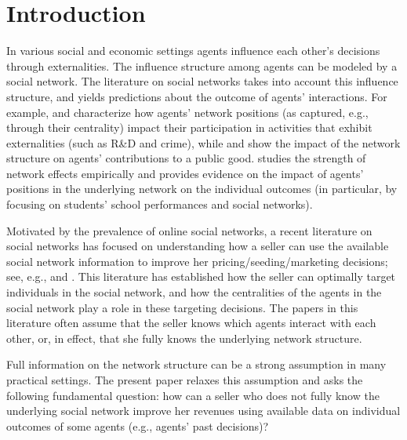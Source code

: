 \documentclass[opre,nonblindrev]{informs3} %
\begin{document}
\maketitle


\section{Introduction} \label{se:Intro}

In various social and economic settings agents influence each other's decisions through externalities. The influence structure among agents can be modeled by a social network. The literature on social networks takes into account this influence structure, and yields predictions about the outcome of agents' interactions.
For example, \citet{ballester2006s} and \citet{bramoulle2014strategic} characterize how
agents' network positions (as captured, e.g., through their centrality)
impact their participation in activities that exhibit externalities (such as R\&D and crime), while
 \citet{bramoulle2007public} and \citet{elliott2013network} show the impact of the network structure on agents' contributions to a public good.
\citet{calvo2009peer}
studies the strength of network effects empirically and
provides evidence on the impact of  agents' positions in the underlying network on  the individual outcomes (in particular, by focusing on students' school performances and social networks).

Motivated by the
prevalence of online social networks, a recent literature on social networks has focused on understanding how a seller can use
the available social network information to improve
her pricing/seeding/marketing
decisions; see, e.g.,
\citet{kempe2003maximizing,candogan2012optimal,belloni2015mechanism,bimpikis2016competitive} and \citet{zhou2016targeted}.
This literature has established how the seller can optimally target individuals in the social network, and how the centralities of the agents in the social network play a role in these targeting decisions.
The papers in this literature often assume that the
seller knows which agents interact with each other,
or, in effect, that she fully knows the underlying network structure.


Full information on the network structure can be a strong assumption  in many practical settings. The present paper relaxes this assumption and asks 
the following fundamental question:
how can a seller who does not fully know the underlying social network improve her  revenues using 
available data on individual outcomes
of some agents
 (e.g., agents' past decisions)?
\end{document}
